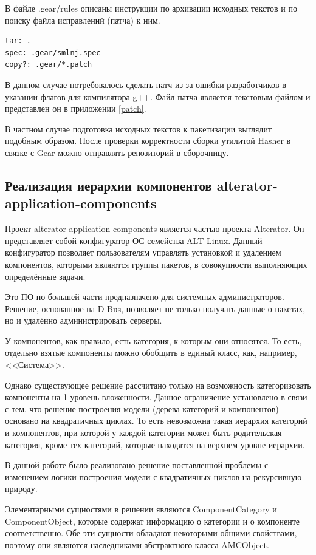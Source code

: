 \documentclass[bachelor, och, pract]{SCWorks}
\begin{document}
В файле .gear/rules описаны инструкции по архивации исходных текстов и по поиску файла исправлений (патча) к ним.

\begin{Verbatim}
tar: .
spec: .gear/smlnj.spec
copy?: .gear/*.patch
\end{Verbatim}

В данном случае потребовалось сделать патч из-за ошибки разработчиков в указании флагов для компилятора g++.
Файл патча является текстовым файлом и представлен он в приложении \ref{patch}.

В частном случае подготовка исходных текстов к пакетизации выглядит подобным образом.
После проверки корректности сборки утилитой Hasher в связке с Gear можно отправлять репозиторий в сборочницу.

\subsection{Реализация иерархии компонентов alterator-application-components}

Проект alterator-application-components является частью проекта Alterator.
Он представляет собой конфигуратор ОС семейства ALT Linux.
Данный конфигуратор позволяет пользователям управлять установкой и удалением компонентов, которыми являются группы пакетов, в совокупности выполняющих определённые задачи.

Это ПО по большей части предназначено для системных администраторов.
Решение, основанное на D-Bus, позволяет не только получать данные о пакетах, но и удалённо администрировать серверы.

У компонентов, как правило, есть категория, к которым они относятся.
То есть, отдельно взятые компоненты можно обобщить в единый класс, как, например, <<Система>>.

Однако существующее решение рассчитано только на возможность категоризовать компоненты на 1 уровень вложенности.
Данное ограничение установлено в связи с тем, что решение построения модели (дерева категорий и компонентов) основано на квадратичных циклах.
То есть невозможна такая иерархия категорий и компонентов, при которой у каждой категории может быть родительская категория, кроме тех категорий, которые находятся на верхнем уровне иерархии.

В данной работе было реализовано решение поставленной проблемы с изменением логики построения модели с квадратичных циклов на рекурсивную природу.

Элементарными сущностями в решении являются ComponentCategory и ComponentObject, которые содержат информацию о категории и о компоненте соответственно.
Обе эти сущности обладают некоторыми общими свойствами, поэтому они являются наследниками абстрактного класса AMCObject.
\end{document}
